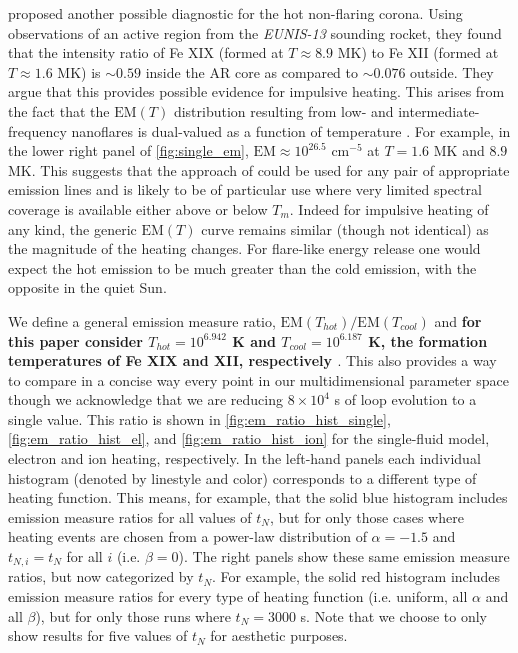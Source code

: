 \documentclass[preprint,linenumbers]{aastex}
\begin{document}
		\par\citet{brosius_pervasive_2014} proposed another possible diagnostic for the hot non-flaring corona. Using observations of an active region from the \textit{EUNIS-13} sounding rocket, they found that the intensity ratio of Fe XIX (formed at $T\approx8.9$ MK) to Fe XII (formed at $T\approx1.6$ MK) is $\sim0.59$ inside the AR core as compared to $\sim0.076$ outside. They argue that this provides possible evidence for impulsive heating. This arises from the fact that the $\mathrm{EM}(T)$ distribution resulting from low- and intermediate-frequency nanoflares is dual-valued as a function of temperature \citep[see \autoref{fig:single_em}-\autoref{fig:ion_em} and][]{cargill_implications_1994}. For example, in the lower right panel of \autoref{fig:single_em}, $\mathrm{EM}\approx 10^{26.5}$ cm$^{-5}$ at $T = 1.6$ MK and $8.9$ MK. This suggests that the approach of \citet{brosius_pervasive_2014} could be used for any pair of appropriate emission lines and is likely to be of particular use where very limited spectral coverage is available either above or below $T_m$. Indeed for impulsive heating of any kind, the generic $\mathrm{EM}(T)$ curve remains similar (though not identical) as the magnitude of the heating changes. For flare-like energy release one would expect the hot emission to be much greater than the cold emission, with the opposite in the quiet Sun.

	\par We define a general emission measure ratio, $\mathrm{EM}(T_{hot})/\mathrm{EM}(T_{cool})$ and \textbf{for this paper consider $T_{hot}=10^{6.942}$ K and $T_{cool}=10^{6.187}$ K, the formation temperatures of Fe XIX and XII, respectively \citep[i.e. the temperature $T$ which maximizes the contribution function $G_{\lambda}(T)$ calculated using CHIANTI v8,][]{dere_chianti_1997,del_zanna_chianti_2015}}. This also provides a way to compare in a concise way every point in our multidimensional parameter space though we acknowledge that we are reducing $8\times10^4$ s of loop evolution to a single value. This ratio is shown in \autoref{fig:em_ratio_hist_single}, \autoref{fig:em_ratio_hist_el}, and \autoref{fig:em_ratio_hist_ion} for the single-fluid model, electron and ion heating, respectively. In the left-hand panels each individual histogram (denoted by linestyle and color) corresponds to a different type of heating function. This means, for example, that the solid blue histogram includes emission measure ratios for all values of $t_N$, but for only those cases where heating events are chosen from a power-law distribution of $\alpha=-1.5$ and $t_{N,i}=t_N$ for all $i$ (i.e. $\beta=0$). The right panels show these same emission measure ratios, but now categorized by $t_N$. For example, the solid red histogram includes emission measure ratios for every type of heating function (i.e. uniform, all $\alpha$ and all $\beta$), but for only those runs where $t_N=3000$ s. Note that we choose to only show results for five values of $t_N$ for aesthetic purposes.
\end{document}
